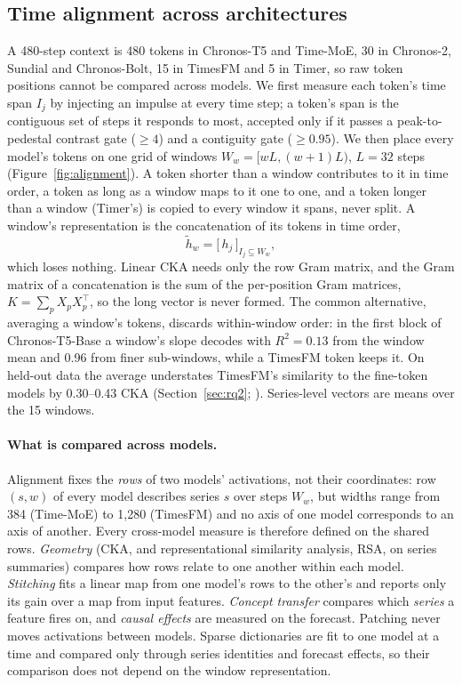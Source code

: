 \subsection{Time alignment across architectures}
\label{sec:alignment}

A 480-step context is 480 tokens in Chronos-T5 and Time-MoE, 30 in Chronos-2, Sundial and Chronos-Bolt, 15 in TimesFM
and 5 in Timer, so raw token positions cannot be compared across models. We first measure each token's time span $I_j$
by injecting an impulse at every time step; a token's span is the contiguous set of steps it responds to most, accepted
only if it passes a peak-to-pedestal contrast gate ($\ge4$) and a contiguity gate ($\ge0.95$). We then place every
model's tokens on one grid of windows $W_w=[wL,(w+1)L)$, $L=32$ steps (Figure~\ref{fig:alignment}). A token shorter
than a window contributes to it in time order, a token as long as a window maps to it one to one, and a token longer than
a window (Timer's) is copied to every window it spans, never split. A window's representation is the concatenation of
its tokens in time order,
\begin{equation}
  \tilde h_w = \big[\,h_j\,\big]_{I_j\subseteq W_w},
  \label{eq:pooling}
\end{equation}
which loses nothing. Linear CKA needs only the row Gram matrix, and the Gram matrix of a concatenation is the sum of the
per-position Gram matrices, $K=\sum_p X_pX_p^{\top}$, so the long vector is never formed. The common alternative,
averaging a window's tokens, discards within-window order: in the first block of Chronos-T5-Base a window's slope decodes
with $R^2=0.13$ from the window mean and 0.96 from finer sub-windows, while a TimesFM token keeps it. On held-out data
the average understates TimesFM's similarity to the fine-token models by 0.30--0.43 CKA (Section~\ref{sec:rq2};
). Series-level vectors are means over the 15 windows.

\paragraph{What is compared across models.} Alignment fixes the \emph{rows} of two models' activations, not their
coordinates: row $(s,w)$ of every model describes series $s$ over steps $W_w$, but widths range from 384 (Time-MoE) to
1{,}280 (TimesFM) and no axis of one model corresponds to an axis of another. Every cross-model measure is therefore
defined on the shared rows. \emph{Geometry} (CKA, and representational similarity analysis, RSA, on series summaries)
compares how rows relate to one another within each model. \emph{Stitching} fits a linear map from one model's rows to
the other's and reports only its gain over a map from input features. \emph{Concept transfer} compares which
\emph{series} a feature fires on, and \emph{causal effects} are measured on the forecast. Patching never moves
activations between models. Sparse dictionaries are fit to one model at a time and compared only through series
identities and forecast effects, so their comparison does not depend on the window representation.

